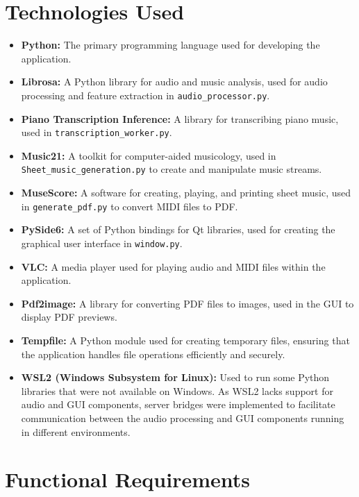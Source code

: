 \documentclass{article}
\begin{document}
\section{Technologies Used}
\begin{itemize}
    \item \textbf{Python:} The primary programming language used for developing the application.
    \item \textbf{Librosa:} A Python library for audio and music analysis, used for audio processing and feature extraction in \texttt{audio\_processor.py}.
    \item \textbf{Piano Transcription Inference:} A library for transcribing piano music, used in \texttt{transcription\_worker.py}.
    \item \textbf{Music21:} A toolkit for computer-aided musicology, used in \texttt{Sheet\_music\_generation.py} to create and manipulate music streams.
    \item \textbf{MuseScore:} A software for creating, playing, and printing sheet music, used in \texttt{generate\_pdf.py} to convert MIDI files to PDF.
    \item \textbf{PySide6:} A set of Python bindings for Qt libraries, used for creating the graphical user interface in \texttt{window.py}.
    \item \textbf{VLC:} A media player used for playing audio and MIDI files within the application.
    \item \textbf{Pdf2image:} A library for converting PDF files to images, used in the GUI to display PDF previews.
    \item \textbf{Tempfile:} A Python module used for creating temporary files, ensuring that the application handles file operations efficiently and securely.
    \item \textbf{WSL2 (Windows Subsystem for Linux):} Used to run some Python libraries that were not available on Windows. As WSL2 lacks support for audio and GUI components, server bridges were implemented to facilitate communication between the audio processing and GUI components running in different environments.
\end{itemize}

\FloatBarrier

\section{Functional Requirements}
\end{document}
